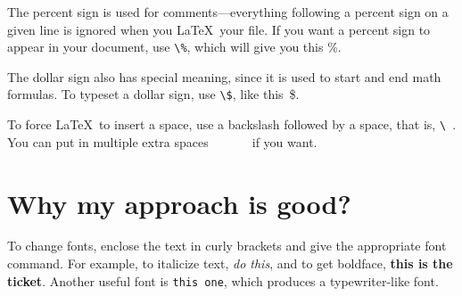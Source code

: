 The percent sign is used for comments---everything following a percent sign 
on a given line is ignored when you \LaTeX\ your file. %
If you want a percent sign to appear in your document, use \verb+\%+, 
which will give you this \%.

The dollar sign also has special meaning, since it is used to start and end
math formulas. To typeset a dollar sign, use \verb+\$+, like this~\$.

To force \LaTeX\ to insert a space, use a backslash followed by
a space, that is, \verb+\ +. You can put in multiple extra spaces\ \ \ \ \ \ \ if you want.

\section{Why my approach is good?}

To change fonts, enclose the text in curly brackets and give the appropriate font command.
For example, to italicize text, {\it do this}, and to get boldface, {\bf this is the ticket}.
Another useful font is {\tt this one}, which produces a typewriter-like font.

